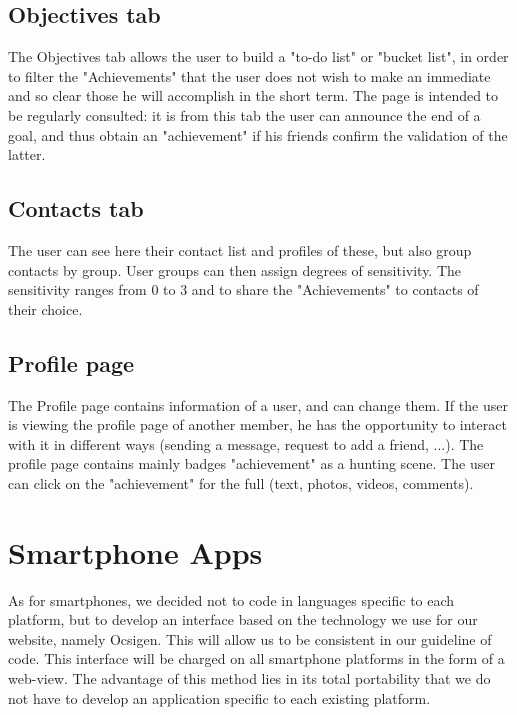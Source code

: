\documentclass{life-fr}
\begin{document}
\subsection{Objectives tab}

The Objectives tab allows the user to build a "to-do list" or "bucket list", in order to filter the "Achievements" that the user does not wish to make an immediate and so clear those he will accomplish in the short term. The page is intended to be regularly consulted: it is from this tab the user can announce the end of a goal, and thus obtain an "achievement" if his friends confirm the validation of the latter.

\subsection{Contacts tab}

The user can see here their contact list and profiles of these, but also group contacts by group. User groups can then assign degrees of sensitivity.
The sensitivity ranges from 0 to 3 and to share the "Achievements" to contacts of their choice.

\subsection{Profile page}

The Profile page contains information of a user, and can change them. If the user is viewing the profile page of another member, he has the opportunity to interact with it in different ways (sending a message, request to add a friend, ...).
The profile page contains mainly badges "achievement" as a hunting scene. The user can click on the "achievement" for the full (text, photos, videos, comments).

\section{Smartphone Apps}

As for smartphones, we decided not to code in languages specific to each platform, but to develop an interface based on the technology we use for our website, namely Ocsigen. This will allow us to be consistent in our guideline of code. This interface will be charged on all smartphone platforms in the form of a web-view. The advantage of this method lies in its total portability that we do not have to develop an application specific to each existing platform.
\end{document}
